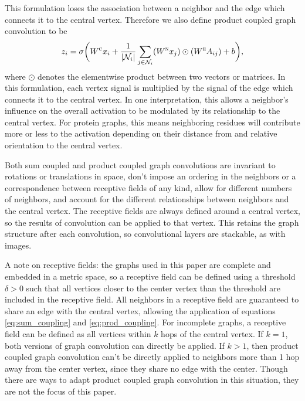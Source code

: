This formulation loses the association between a neighbor and the edge which connects it to the central vertex. 
Therefore we also define product coupled graph convolution to be 
\begin{equation}
z_i = \sigma \bigg( W^{\textsc{c}} x_i + \frac{1}{|\mathcal{N}_i|}\sum_{j \in \mathcal{N}_i} (W^{\textsc{n}} x_j) \odot (W^{\textsc{e}} A_{ij}) + b \bigg),
\label{eq:prod_coupling}
\end{equation}
where $\odot$ denotes the elementwise product between two vectors or matrices. 
In this formulation, each vertex signal is multiplied by the signal of the edge which connects it to the central vertex.
In one interpretation, this allows a neighbor's influence on the overall activation to be modulated by its relationship to the central vertex.
For protein graphs, this means neighboring residues will contribute more or less to the activation depending on their distance from and relative orientation to the central vertex.

Both sum coupled and product coupled graph convolutions are invariant to rotations or translations in space, don't impose an ordering in the neighbors or a correspondence between receptive fields of any kind, allow for different numbers of neighbors, and account for the different relationships between neighbors and the central vertex. 
The receptive fields are always defined around a central vertex, so the results of convolution can be applied to that vertex.
This retains the graph structure after each convolution, so convolutional layers are stackable, as with images.

A note on receptive fields: 
the graphs used in this paper are complete and embedded in a metric space, so a receptive field can be defined using a threshold $\delta>0$ such that all vertices closer to the center vertex than the threshold are included in the receptive field.
All neighbors in a receptive field are guaranteed to share an edge with the central vertex, allowing the application of equations \ref{eq:sum_coupling} and \ref{eq:prod_coupling}.
For incomplete graphs, a receptive field can be defined as all vertices within $k$ hops of the central vertex. 
If $k=1$, both versions of graph convolution can directly be applied.
If $k>1$, then product coupled graph convolution can't be directly applied to neighbors more than 1 hop away from the center vertex, since they share no edge with the center. 
Though there are ways to adapt product coupled graph convolution in this situation, they are not the focus of this paper.


